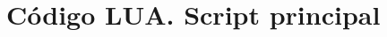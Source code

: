 \clearpage
\thispagestyle{empty}
\mbox{}

\chapter{Código LUA. Script principal}
\label{apenddixF}

